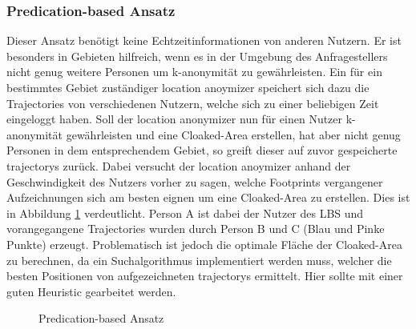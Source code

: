 \subsubsection{Predication-based Ansatz} 
Dieser Ansatz benötigt keine Echtzeitinformationen von anderen Nutzern. Er ist besonders in Gebieten hilfreich, wenn es in der Umgebung des Anfragestellers nicht genug weitere Personen um k-anonymität zu gewährleisten. Ein für ein bestimmtes Gebiet zuständiger location anoymizer speichert sich dazu die Trajectories von verschiedenen Nutzern, welche sich zu einer beliebigen Zeit eingeloggt haben. Soll der location anonymizer nun für einen Nutzer k-anonymität gewährleisten und eine Cloaked-Area erstellen, hat aber nicht genug Personen in dem entsprechendem Gebiet, so greift dieser auf zuvor gespeicherte trajectorys zurück. Dabei versucht der location anoymizer anhand der Geschwindigkeit des Nutzers vorher zu sagen, welche Footprints vergangener Aufzeichnungen sich am besten eignen um eine Cloaked-Area zu erstellen. Dies ist in Abbildung \ref{fig_chow2011_PredicationBased-Ansatz} verdeutlicht. Person A ist dabei der Nutzer des LBS und vorangegangene Trajectories wurden durch Person B und C (Blau und Pinke Punkte) erzeugt. Problematisch ist jedoch die optimale Fläche der Cloaked-Area zu berechnen, da ein Suchalgorithmus implementiert werden muss, welcher die besten Positionen von aufgezeichneten trajectorys ermittelt. Hier sollte mit einer guten Heuristic gearbeitet werden. 
\begin{figure}[!h]
		\centering
		\caption{Predication-based Ansatz}
		\label{fig_chow2011_PredicationBased-Ansatz}
\end{figure}

